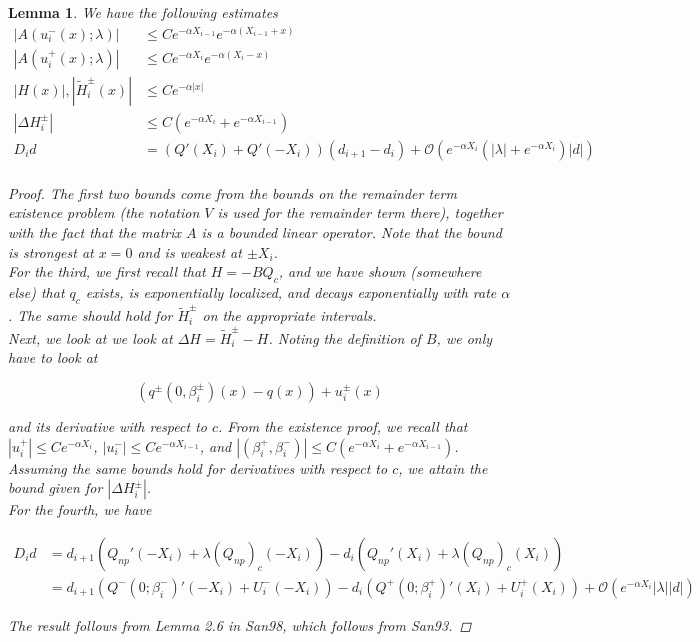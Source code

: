 \documentclass[12pt]{article}
\newtheorem{lemma}{Lemma}
\begin{document}
\begin{lemma}\label{problembounds}
We have the following estimates
\begin{align*}
|A(u_i^-(x); \lambda)| &\leq C e^{-\alpha X_{i-1}} e^{-\alpha(X_{i-1} + x) } \\
|A(u_i^+(x); \lambda)| &\leq C e^{-\alpha X_i} e^{-\alpha(X_i - x) } \\
|H(x)|, |\tilde{H}_i^\pm(x)| &\leq C e^{-\alpha |x|} \\
|\Delta H_i^\pm| &\leq C(e^{-\alpha X_i} + e^{-\alpha X_{i-1}} ) \\
D_i d &= ( Q'(X_i) + Q'(-X_i))(d_{i+1} - d_i ) + \mathcal{O} \left( e^{-\alpha X_i} \left( |\lambda| +  e^{-\alpha X_i}  \right) |d| \right) \\
\end{align*}

\begin{proof}
The first two bounds come from the bounds on the remainder term existence problem (the notation $V$ is used for the remainder term there), together with the fact that the matrix $A$ is a bounded linear operator. Note that the bound is strongest at $x = 0$ and is weakest at $\pm X_i$. \\

For the third, we first recall that $H = -B Q_c$, and we have shown (somewhere else) that $q_c$ exists, is exponentially localized, and decays exponentially with rate $\alpha$. The same should hold for $\tilde{H}_i^\pm$ on the appropriate intervals.\\
 
Next, we look at we look at $\Delta H = \tilde{H}_i^\pm - H$. Noting the definition of $B$, we only have to look at 

\[
(q^\pm(0, \beta_i^\pm)(x) - q(x)) + u_i^\pm(x)
\]

and its derivative with respect to $c$. From the existence proof, we recall that $|u_i^+| \leq C e^{-\alpha X_i}$, $|u_i^-| \leq C e^{-\alpha X_{i-1}}$, and $|(\beta_i^+, \beta_i^-)| \leq C( e^{-\alpha X_i} + e^{-\alpha X_{i-1}})$. Assuming the same bounds hold for derivatives with respect to $c$, we attain the bound given for $|\Delta H_i^\pm|$.\\

For the fourth, we have

\begin{align*}
D_i d &= d_{i+1}(Q_{np}'(-X_i) + \lambda (Q_{np})_c(-X_i)) - d_i ( Q_{np}'(X_i) + \lambda (Q_{np})_c(X_i) ) \\
&= d_{i+1} (Q^-(0; \beta_i^-)'(-X_i) + U_i^-(-X_i)) - d_i (Q^+(0; \beta_i^+)'(X_i) + U_i^+(X_i)) + \mathcal{O}(e^{-\alpha X_i} |\lambda||d|)
\end{align*}

The result follows from Lemma 2.6 in San98, which follows from San93.

\end{proof}
\end{lemma}
\end{document}
